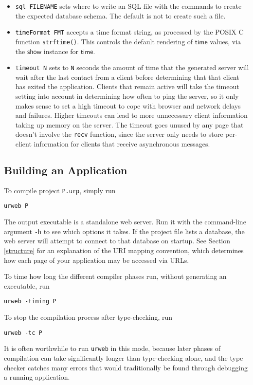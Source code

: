 \documentclass{article}
\newcommand{\cd}[1]{\texttt{#1}}
\newcommand{\mt}[1]{\mathsf{#1}}
\begin{document}
\begin{itemize}
\item \texttt{sql FILENAME} sets where to write an SQL file with the commands to create the expected database schema.  The default is not to create such a file.
\item \texttt{timeFormat FMT} accepts a time format string, as processed by the POSIX C function \texttt{strftime()}.  This controls the default rendering of $\mt{time}$ values, via the $\mt{show}$ instance for $\mt{time}$.
\item \texttt{timeout N} sets to \texttt{N} seconds the amount of time that the generated server will wait after the last contact from a client before determining that that client has exited the application.  Clients that remain active will take the timeout setting into account in determining how often to ping the server, so it only makes sense to set a high timeout to cope with browser and network delays and failures.  Higher timeouts can lead to more unnecessary client information taking up memory on the server.  The timeout goes unused by any page that doesn't involve the \texttt{recv} function, since the server only needs to store per-client information for clients that receive asynchronous messages.
\end{itemize}


\subsection{Building an Application}

To compile project \texttt{P.urp}, simply run
\begin{verbatim}
urweb P
\end{verbatim}
The output executable is a standalone web server.  Run it with the command-line argument \texttt{-h} to see which options it takes.  If the project file lists a database, the web server will attempt to connect to that database on startup.  See Section \ref{structure} for an explanation of the URI mapping convention, which determines how each page of your application may be accessed via URLs.

To time how long the different compiler phases run, without generating an executable, run
\begin{verbatim}
urweb -timing P
\end{verbatim}

To stop the compilation process after type-checking, run
\begin{verbatim}
urweb -tc P
\end{verbatim}
It is often worthwhile to run \cd{urweb} in this mode, because later phases of compilation can take significantly longer than type-checking alone, and the type checker catches many errors that would traditionally be found through debugging a running application.
\end{document}
